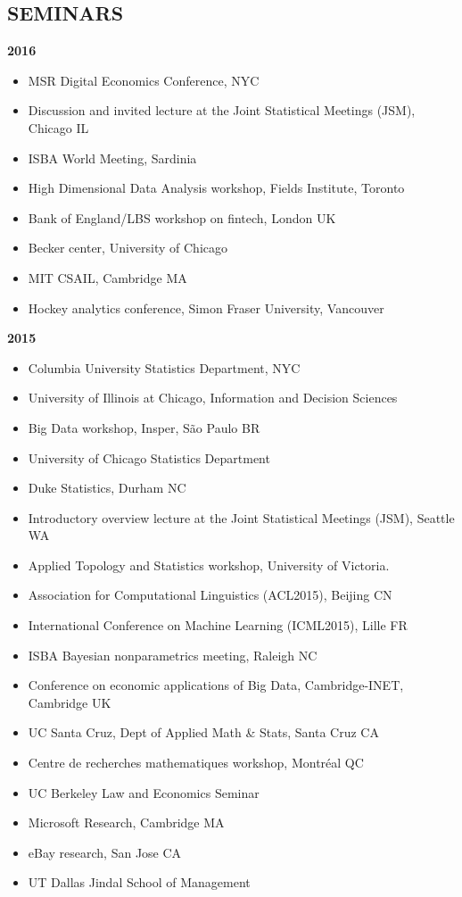 \documentclass[margin,line]{res}
\begin{document}
\begin{resume}
\section{\bf SEMINARS}

{\bf 2016}
\begin{itemize}
\item MSR Digital Economics Conference, NYC
\item Discussion and invited lecture at the Joint Statistical Meetings (JSM), Chicago IL
\item ISBA World Meeting, Sardinia
\item High Dimensional Data Analysis workshop, Fields Institute, Toronto
\item Bank of England/LBS workshop on fintech, London UK
\item Becker center, University of Chicago
\item MIT CSAIL, Cambridge MA
\item Hockey analytics conference, Simon Fraser University, Vancouver
\end{itemize}

{\bf 2015}
\begin{itemize}
\item Columbia University Statistics Department, NYC
\item University of Illinois at Chicago, Information and Decision Sciences 
\item Big Data workshop, Insper, S\~ao Paulo BR
\item University of Chicago Statistics Department
\item Duke Statistics, Durham NC
\item Introductory overview lecture at the Joint Statistical Meetings (JSM), Seattle WA
\item Applied Topology and Statistics workshop, University of Victoria.
\item Association for Computational Linguistics (ACL2015), Beijing CN
\item International Conference on Machine Learning (ICML2015), Lille FR
\item ISBA Bayesian nonparametrics meeting, Raleigh NC
\item Conference on economic applications of Big Data, Cambridge-INET, Cambridge UK
\item UC Santa Cruz, Dept of Applied Math \& Stats, Santa Cruz CA
\item Centre de recherches mathematiques workshop, Montr\'eal QC
\item UC Berkeley Law and Economics Seminar
\item Microsoft Research, Cambridge MA
\item eBay research, San Jose CA
\item UT Dallas Jindal School of Management
\end{itemize}



\end{resume}
\end{document}

